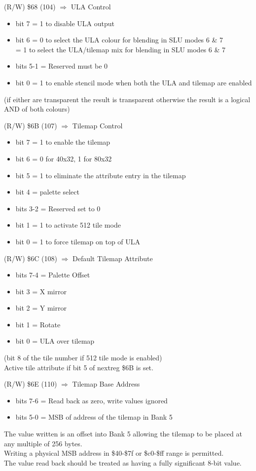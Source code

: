 (R/W) \$68 (104) $\Rightarrow$ ULA Control
\begin{itemize}
\item[] bit 7 = 1 to disable ULA output
\item[] bit 6 = 0 to select the ULA colour for blending in SLU modes 6
  \& 7\\
  = 1 to select the ULA/tilemap mix for blending in SLU modes 6 \& 7
\item[] bits 5-1 = Reserved must be 0
\item[] bit 0 = 1 to enable stencil mode when both the ULA and tilemap are enabled
\end{itemize}
(if either are transparent the result is transparent otherwise the
result is a logical AND of both colours)

(R/W) \$6B (107) $\Rightarrow$ Tilemap Control
\begin{itemize}
\item[] bit 7 = 1 to enable the tilemap
\item[] bit 6 = 0 for 40x32, 1 for 80x32
\item[] bit 5 = 1 to eliminate the attribute entry in the tilemap
\item[] bit 4 = palette select
\item[] bits 3-2 = Reserved set to 0
\item[] bit 1 = 1 to activate 512 tile mode
\item[] bit 0 = 1 to force tilemap on top of ULA
\end{itemize}

(R/W) \$6C (108) $\Rightarrow$ Default Tilemap Attribute
\begin{itemize}
\item[] bits 7-4 = Palette Offset
\item[] bit 3 = X mirror
\item[] bit 2 = Y mirror
\item[] bit 1 = Rotate
\item[] bit 0 = ULA over tilemap
\end{itemize}
(bit 8 of the tile number if 512 tile mode is enabled)\\
Active tile attribute if bit 5 of nextreg \$6B is set.

(R/W) \$6E (110) $\Rightarrow$ Tilemap Base Address
\begin{itemize}
\item[] bits 7-6 = Read back as zero, write values ignored
\item[] bits 5-0 = MSB of address of the tilemap in Bank 5
\end{itemize}
The value written is an offset into Bank 5 allowing the tilemap to be
placed at any multiple of 256 bytes.\\
Writing a physical MSB address in \$40-\$7f or \$c0-\$ff range is
permitted.\\
The value read back should be treated as having a fully significant
8-bit value.

